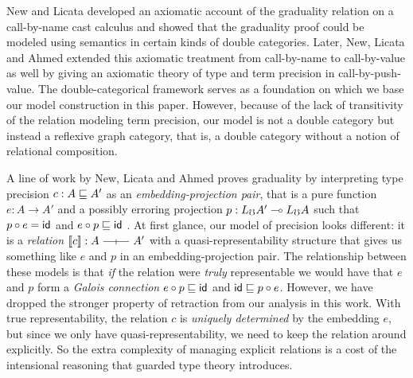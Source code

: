 New and Licata \cite{new-licata18} developed an axiomatic account of the
graduality relation on a call-by-name cast calculus and showed that the
graduality proof could be modeled using semantics in certain kinds of double
categories.
%
Later, New, Licata and Ahmed \cite{new-licata-ahmed2019} extended this axiomatic
treatment from call-by-name to call-by-value as well by giving an axiomatic
theory of type and term precision in call-by-push-value. The double-categorical
framework serves as a foundation on which we base our model construction in this
paper. However, because of the lack of transitivity of the relation modeling
term precision, our model is not a double category but instead a reflexive graph
category, that is, a double category without a notion of relational composition.




A line of work by New, Licata and Ahmed proves graduality by
interpreting type precision $c : A \sqsubseteq A'$ as an
\emph{embedding-projection pair}, that is a pure function $e : A \to
A'$ and a possibly erroring projection $p : L_\mho A' \multimap L_\mho A$
such that $p \circ e = \mathsf{id}$ and $e \circ p \sqsubseteq \mathsf{id}$
\cite{new-ahmed2018,new-licata18,new-licata-ahmed2019}. At first glance, our model
of precision looks different: it is a \emph{relation}
$\sem{c} : A \rel A'$ with a quasi-representability structure that
gives us something like $e$ and $p$ in an embedding-projection
pair. The relationship between these models is that \emph{if} the
relation were \emph{truly} representable we would have that $e$ and $p$ form a \emph{Galois
connection} $e \circ p \sqsubseteq \mathsf{id}$ and $\mathsf{id} \sqsubseteq p \circ
e$. However, we have dropped the stronger property of retraction from
our analysis in this work. With true representability, the relation
$c$ is \emph{uniquely determined} by the embedding $e$, but since we
only have quasi-representability, we need to keep the relation around
explicitly. So the extra complexity of managing explicit relations is
a cost of the intensional reasoning that guarded type theory
introduces.

